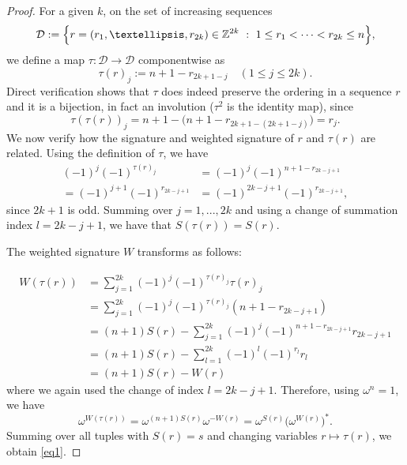 \documentclass[10pt,a4paper]{amsart}
\newcommand{\beq}{\begin{equation}}
\newcommand{\eeq}{\end{equation}}
\begin{document}
\begin{proof}
For a given $k$, on the set of increasing sequences
\beq\label{Dset}
\mathcal D := \Bigl\{  r=(r_1,\dots,r_{2k})\in\mathbb Z^{2k}\ :\ 1\le r_1<\cdots<r_{2k}\le n \Bigr\}, 
\eeq
we define a map   $\tau   :   \mathcal D \rightarrow  \mathcal D$ componentwise as 
\beq
\tau(r)_j  :=  n+1-r_{2k+1-j}\quad (1\le j\le 2k).
\eeq
Direct verification shows that $\tau$ does indeed preserve the ordering in a sequence $r$ and it is a bijection, in fact an involution ($\tau^2$ is the identity map), since 
\beq
\tau(\tau(r))_j
=n+1-\bigl(n+1-r_{2k+1-(2k+1-j)}\bigr)=r_j. 
\eeq
We  now verify how the signature and weighted signature of $r$ and $\tau(r)$ are related. Using the definition of $\tau$, we have 
\beq 
\begin{aligned}
(-1)^j (-1)^{\tau(r)_j}&=(-1)^j(-1)^{n+1-r_{2k-j+1}}\\
=(-1)^{j+1}(-1)^{r_{2k-j+1}}&
=(-1)^{2k-j+1}(-1)^{r_{2k-j+1}}, 
\end{aligned}
\eeq
since $2k+1$ is odd. Summing over $j=1,...,2k$ and using a change of summation index $l=2k-j+1$, we have that $S(\tau(r))=S(r)$. 

The weighted signature $W$ transforms as follows:

\beq
\begin{aligned}
   W(\tau(r))
&= \sum_{j=1}^{2k}    (-1)^j (-1)^{\tau(r)_j} \tau(r)_j\\
 &=\sum_{j=1}^{2k}    (-1)^j (-1)^{\tau(r)_j}(n+1-r_{2k-j+1})\\
 &=(n+1)S(r)-\sum_{j=1}^{2k}(-1)^j (-1)^{n+1-r_{2k-j+1}}r_{2k-j+1}\\
 &=(n+1)S(r)-\sum_{l=1}^{2k}(-1)^l (-1)^{r_{l}}r_{l}\\
 &=(n+1)S(r)-W(r)
\end{aligned}
\eeq
where we again used the change of index $l=2k-j+1$. Therefore, using $\omega^n=1$, we have 
\beq
\omega^{W(\tau(r))}
= \omega^{(n+1)S(r)}\omega^{-W(r)}
= \omega^{S(r)}\big(\omega^{W(r)}\big)^*.
\eeq
Summing over all tuples with $S(r)=s$ and changing variables $r\mapsto \tau(r)$, we obtain \cref{eq1}. 

\end{proof}
\end{document}
